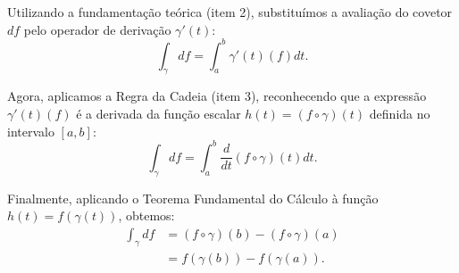{	Utilizando a fundamentação teórica (item 2), substituímos a avaliação do covetor $df$ pelo operador de derivação $\gamma'(t)$:
	\begin{equation*}
		\int_\gamma df = \int_a^b \gamma'(t)(f) dt.
	\end{equation*}
	
	Agora, aplicamos a Regra da Cadeia (item 3), reconhecendo que a expressão $\gamma'(t)(f)$ é a derivada da função escalar $h(t) = (f \circ \gamma)(t)$ definida no intervalo $[a,b]$:
	\begin{equation*}
		\int_\gamma df = \int_a^b \frac{d}{dt}(f \circ \gamma)(t) dt.
	\end{equation*}
	
	Finalmente, aplicando o Teorema Fundamental do Cálculo à função $h(t) = f(\gamma(t))$, obtemos:
	\begin{align*}
		\int_\gamma df &= (f \circ \gamma)(b) - (f \circ \gamma)(a) \\
		&= f(\gamma(b)) - f(\gamma(a)).
	\end{align*}
}


